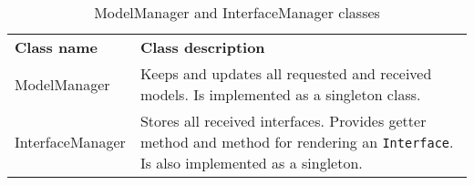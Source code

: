 \begin{table}[htbp]
  \centering
  \caption{ModelManager and InterfaceManager classes}
  \label{tab:uipManagers}
 \renewcommand{\arraystretch}{1.2}
    \begin{tabularx}{\textwidth}{p{3cm}|X}
    \rowcolor{mygray}
    \textbf{Class name} & \textbf{Class description} \\
     ModelManager & Keeps and updates all requested and received models. Is implemented as a singleton class. \\ \hline
       \hspace{0pt}InterfaceManager & Stores all received interfaces. Provides getter method and method for rendering an \texttt{Interface}. Is also implemented as a singleton.\\
    \end{tabularx}%
\end{table}%